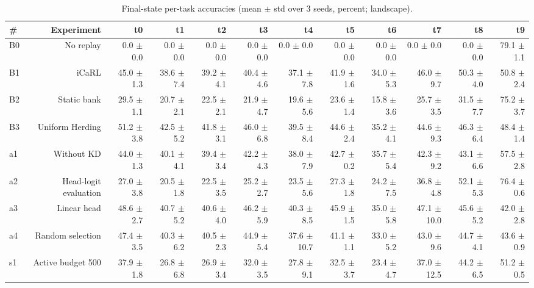 \documentclass{article}
\begin{document}
\begin{table}[htbp]
  \centering
  \caption{Final-state per-task accuracies (mean $\pm$ std over 3 seeds, percent; landscape).}
  \label{tab:A2_per_task_accuracies}
  \begin{tabular}{lrrrrrrrrrrr}
    \toprule
    \textbf{\#} & \textbf{Experiment} & \textbf{t0} & \textbf{t1} & \textbf{t2} & \textbf{t3} & \textbf{t4} & \textbf{t5} & \textbf{t6} & \textbf{t7} & \textbf{t8} & \textbf{t9} \\
    \midrule
    B0 & No replay & 0.0 $\pm$ 0.0 & 0.0 $\pm$ 0.0 & 0.0 $\pm$ 0.0 & 0.0 $\pm$ 0.0 & 0.0 $\pm$ 0.0 & 0.0 $\pm$ 0.0 & 0.0 $\pm$ 0.0 & 0.0 $\pm$ 0.0 & 0.0 $\pm$ 0.0 & 79.1 $\pm$ 1.1 \\
    B1 & iCaRL & 45.0 $\pm$ 1.3 & 38.6 $\pm$ 7.4 & 39.2 $\pm$ 4.1 & 40.4 $\pm$ 4.6 & 37.1 $\pm$ 7.8 & 41.9 $\pm$ 1.6 & 34.0 $\pm$ 5.3 & 46.0 $\pm$ 9.7 & 50.3 $\pm$ 4.0 & 50.8 $\pm$ 2.4 \\
    B2 & Static bank & 29.5 $\pm$ 1.1 & 20.7 $\pm$ 2.1 & 22.5 $\pm$ 2.1 & 21.9 $\pm$ 4.7 & 19.6 $\pm$ 5.6 & 23.6 $\pm$ 1.4 & 15.8 $\pm$ 3.6 & 25.7 $\pm$ 3.5 & 31.5 $\pm$ 7.7 & 75.2 $\pm$ 3.7 \\
    B3 & Uniform Herding & 51.2 $\pm$ 3.8 & 42.5 $\pm$ 5.2 & 41.8 $\pm$ 3.1 & 46.0 $\pm$ 6.8 & 39.5 $\pm$ 8.4 & 44.6 $\pm$ 2.4 & 35.2 $\pm$ 4.1 & 44.6 $\pm$ 9.3 & 46.3 $\pm$ 6.4 & 48.4 $\pm$ 1.4 \\
    a1 & Without KD & 44.0 $\pm$ 1.3 & 40.1 $\pm$ 4.1 & 39.4 $\pm$ 3.4 & 42.2 $\pm$ 4.3 & 38.0 $\pm$ 7.9 & 42.7 $\pm$ 0.2 & 35.7 $\pm$ 5.4 & 42.3 $\pm$ 9.2 & 43.1 $\pm$ 6.6 & 57.5 $\pm$ 2.8 \\
    a2 & Head-logit evaluation & 27.0 $\pm$ 3.8 & 20.5 $\pm$ 1.8 & 22.5 $\pm$ 3.5 & 25.2 $\pm$ 2.7 & 23.5 $\pm$ 5.6 & 27.3 $\pm$ 1.8 & 24.2 $\pm$ 7.5 & 36.8 $\pm$ 4.8 & 52.1 $\pm$ 5.3 & 76.4 $\pm$ 0.6 \\
    a3 & Linear head & 48.6 $\pm$ 2.7 & 40.7 $\pm$ 5.2 & 40.6 $\pm$ 4.0 & 46.2 $\pm$ 5.9 & 40.3 $\pm$ 8.5 & 45.9 $\pm$ 1.5 & 35.0 $\pm$ 5.8 & 47.1 $\pm$ 10.0 & 45.6 $\pm$ 5.2 & 42.0 $\pm$ 2.8 \\
    a4 & Random selection & 47.4 $\pm$ 3.5 & 40.3 $\pm$ 6.2 & 40.5 $\pm$ 2.3 & 44.9 $\pm$ 5.4 & 37.6 $\pm$ 10.7 & 41.1 $\pm$ 1.1 & 33.0 $\pm$ 5.2 & 43.0 $\pm$ 9.6 & 44.7 $\pm$ 4.1 & 43.6 $\pm$ 0.9 \\
    s1 & Active budget 500 & 37.9 $\pm$ 1.8 & 26.8 $\pm$ 6.8 & 26.9 $\pm$ 3.4 & 32.0 $\pm$ 3.5 & 27.8 $\pm$ 9.1 & 32.5 $\pm$ 3.7 & 23.4 $\pm$ 4.7 & 37.0 $\pm$ 12.5 & 44.2 $\pm$ 6.5 & 51.2 $\pm$ 0.5 \\

\end{tabular}
\end{table}
\end{document}
